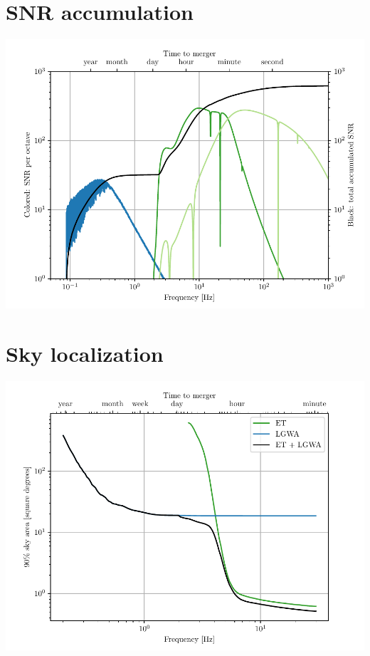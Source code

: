 \documentclass[a0paper,fleqn]{betterposter}
\begin{document}
{\section{SNR accumulation}
\includegraphics[width=\textwidth]{../plots/snr_integrand.pdf}
\section{Sky localization}
\includegraphics[width=\textwidth]{../plots/localizations.pdf}
    

}
\end{document}
